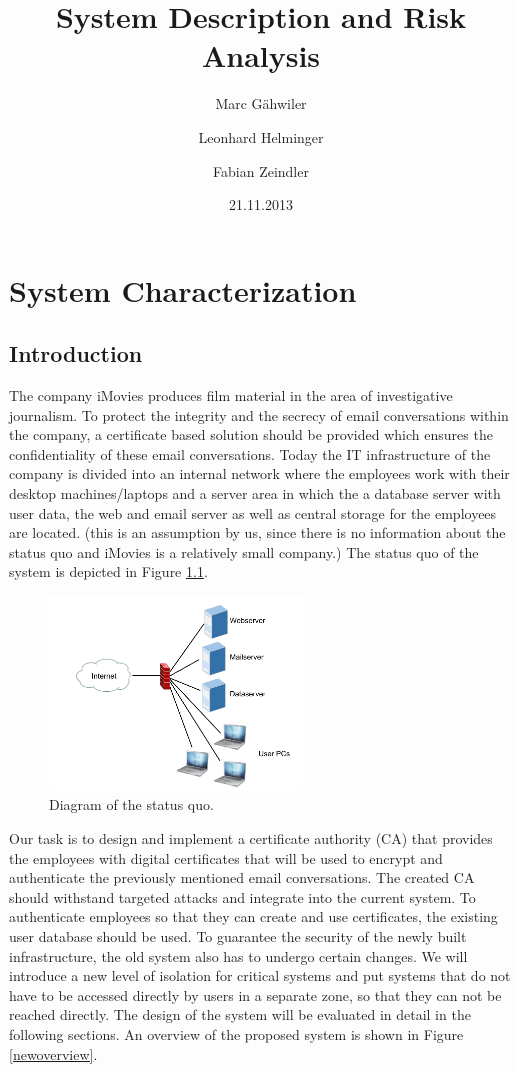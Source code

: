 \documentclass[a4paper, toc=index, 12pt, DIV14, twoside, BCOR2cm, headsepline, numbers=noenddot, bibliography=totoc]{report}
\title{\huge\sffamily\bfseries System Description and Risk Analysis}
\author{Marc G\"ahwiler \and Leonhard Helminger \and Fabian Zeindler}
\date{21.11.2013}
\begin{document}
\maketitle

\tableofcontents
\pagebreak


\chapter{System Characterization}
\section{Introduction}
The company iMovies produces film material in the area of investigative journalism. To protect the integrity and the secrecy of email conversations within the company, a certificate based solution should be provided which ensures the confidentiality of these email conversations.\newline
Today the IT infrastructure of the company is divided into an internal network where the employees work with their desktop machines/laptops and a server area in which the a database server with user data, the web and email server as well as central storage for the employees are located. (this is an assumption by us, since there is no information about the status quo and iMovies is a relatively small company.) The status quo of the system is depicted in Figure \ref{oldsystem}.

\begin{figure}[H]
  \centering
    \includegraphics[width=0.6\textwidth]{images/old_system.pdf}  
  \caption{Diagram of the status quo.}
  \label{oldsystem}
\end{figure}

Our task is to design and implement a certificate authority (CA) that provides the employees with digital certificates that will be used to encrypt and authenticate the previously mentioned email conversations.\newline
The created CA should withstand targeted attacks and integrate into the current system. To authenticate employees so that they can create and use certificates, the existing user database should be used. To guarantee the security of the newly built infrastructure, the old system also has to undergo certain changes. We will introduce a new level of isolation for critical systems and put systems that do not have to be accessed directly by users in a separate zone, so that they can not be reached directly. The design of the system will be evaluated in detail in the following sections. An overview of the proposed system is shown in Figure \ref{newoverview}.
\end{document}
